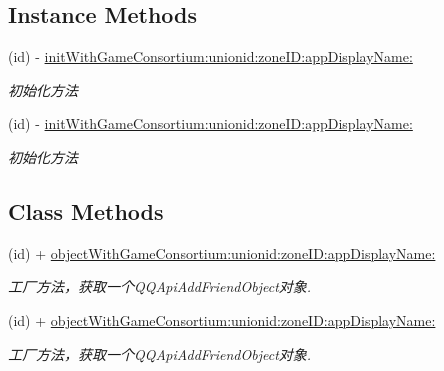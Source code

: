 \subsection*{Instance Methods}
\begin{DoxyCompactItemize}
\item 
\mbox{\label{interface_q_q_api_game_consortium_binding_group_object_a18c9a011eefb340dbe8ddbc788c39f69}} 
(id) -\/ \mbox{\hyperlink{interface_q_q_api_game_consortium_binding_group_object_a18c9a011eefb340dbe8ddbc788c39f69}{init\+With\+Game\+Consortium\+:unionid\+:zone\+I\+D\+:app\+Display\+Name\+:}}
\begin{DoxyCompactList}\small\item\em 初始化方法 \end{DoxyCompactList}\item 
\mbox{\label{interface_q_q_api_game_consortium_binding_group_object_a18c9a011eefb340dbe8ddbc788c39f69}} 
(id) -\/ \mbox{\hyperlink{interface_q_q_api_game_consortium_binding_group_object_a18c9a011eefb340dbe8ddbc788c39f69}{init\+With\+Game\+Consortium\+:unionid\+:zone\+I\+D\+:app\+Display\+Name\+:}}
\begin{DoxyCompactList}\small\item\em 初始化方法 \end{DoxyCompactList}\end{DoxyCompactItemize}
\subsection*{Class Methods}
\begin{DoxyCompactItemize}
\item 
\mbox{\label{interface_q_q_api_game_consortium_binding_group_object_a584afdf88fb607e812902329b8f3d668}} 
(id) + \mbox{\hyperlink{interface_q_q_api_game_consortium_binding_group_object_a584afdf88fb607e812902329b8f3d668}{object\+With\+Game\+Consortium\+:unionid\+:zone\+I\+D\+:app\+Display\+Name\+:}}
\begin{DoxyCompactList}\small\item\em 工厂方法，获取一个\+Q\+Q\+Api\+Add\+Friend\+Object对象. \end{DoxyCompactList}\item 
\mbox{\label{interface_q_q_api_game_consortium_binding_group_object_a584afdf88fb607e812902329b8f3d668}} 
(id) + \mbox{\hyperlink{interface_q_q_api_game_consortium_binding_group_object_a584afdf88fb607e812902329b8f3d668}{object\+With\+Game\+Consortium\+:unionid\+:zone\+I\+D\+:app\+Display\+Name\+:}}
\begin{DoxyCompactList}\small\item\em 工厂方法，获取一个\+Q\+Q\+Api\+Add\+Friend\+Object对象. \end{DoxyCompactList}\end{DoxyCompactItemize}

